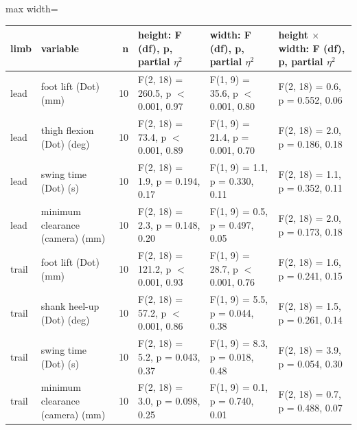\begin{adjustbox}{max width=\textwidth}
{\scriptsize
\begin{tabular}{llrp{3.5cm}p{3.5cm}p{3.5cm}}
\toprule
\textbf{limb} & \textbf{variable} & \textbf{n} & \textbf{height: F (df), p, partial $\eta^2$} & \textbf{width: F (df), p, partial $\eta^2$} & \textbf{height $\times$ width: F (df), p, partial $\eta^2$} \\
\midrule
lead & foot lift (Dot) (mm) & 10 & F(2, 18) = 260.5, p $<$ 0.001, 0.97 & F(1, 9) = 35.6, p $<$ 0.001, 0.80 & F(2, 18) = 0.6, p = 0.552, 0.06 \\
lead & thigh flexion (Dot) (deg) & 10 & F(2, 18) = 73.4, p $<$ 0.001, 0.89 & F(1, 9) = 21.4, p = 0.001, 0.70 & F(2, 18) = 2.0, p = 0.186, 0.18 \\
lead & swing time (Dot) (s) & 10 & F(2, 18) = 1.9, p = 0.194, 0.17 & F(1, 9) = 1.1, p = 0.330, 0.11 & F(2, 18) = 1.1, p = 0.352, 0.11 \\
lead & minimum clearance (camera) (mm) & 10 & F(2, 18) = 2.3, p = 0.148, 0.20 & F(1, 9) = 0.5, p = 0.497, 0.05 & F(2, 18) = 2.0, p = 0.173, 0.18 \\
trail & foot lift (Dot) (mm) & 10 & F(2, 18) = 121.2, p $<$ 0.001, 0.93 & F(1, 9) = 28.7, p $<$ 0.001, 0.76 & F(2, 18) = 1.6, p = 0.241, 0.15 \\
trail & shank heel-up (Dot) (deg) & 10 & F(2, 18) = 57.2, p $<$ 0.001, 0.86 & F(1, 9) = 5.5, p = 0.044, 0.38 & F(2, 18) = 1.5, p = 0.261, 0.14 \\
trail & swing time (Dot) (s) & 10 & F(2, 18) = 5.2, p = 0.043, 0.37 & F(1, 9) = 8.3, p = 0.018, 0.48 & F(2, 18) = 3.9, p = 0.054, 0.30 \\
trail & minimum clearance (camera) (mm) & 10 & F(2, 18) = 3.0, p = 0.098, 0.25 & F(1, 9) = 0.1, p = 0.740, 0.01 & F(2, 18) = 0.7, p = 0.488, 0.07 \\
\bottomrule
\end{tabular}
}
\end{adjustbox}

